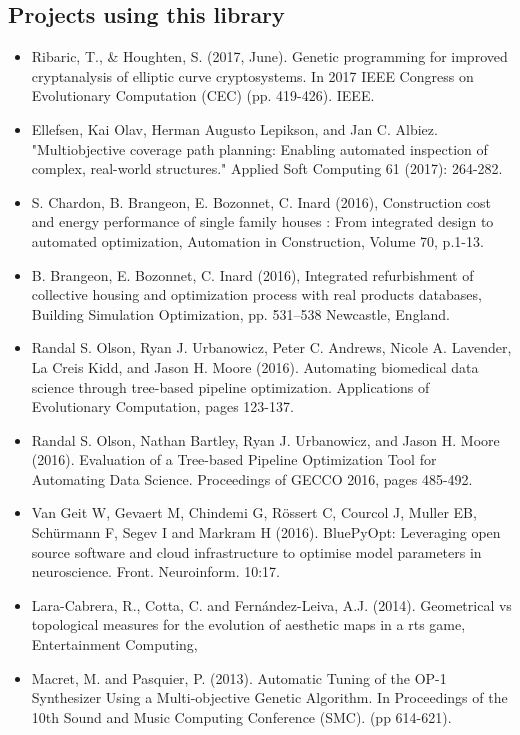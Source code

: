 \documentclass{article}
\begin{document}
	\subsection{Projects using this library}
	\begin{itemize}
		\item 
		Ribaric, T., & Houghten, S. (2017, June). Genetic programming for improved cryptanalysis of elliptic curve cryptosystems. In 2017 IEEE Congress on Evolutionary Computation (CEC) (pp. 419-426). IEEE.
		\item Ellefsen, Kai Olav, Herman Augusto Lepikson, and Jan C. Albiez. "Multiobjective coverage path planning: Enabling automated inspection of complex, real-world structures." Applied Soft Computing 61 (2017): 264-282.
		\item S. Chardon, B. Brangeon, E. Bozonnet, C. Inard (2016), Construction cost and energy performance of single family houses : From integrated design to automated optimization, Automation in Construction, Volume 70, p.1-13.
		\item B. Brangeon, E. Bozonnet, C. Inard (2016), Integrated refurbishment of collective housing and optimization process with real products databases, Building Simulation Optimization, pp. 531–538 Newcastle, England.
		\item Randal S. Olson, Ryan J. Urbanowicz, Peter C. Andrews, Nicole A. Lavender, La Creis Kidd, and Jason H. Moore (2016). Automating biomedical data science through tree-based pipeline optimization. Applications of Evolutionary Computation, pages 123-137.
		\item Randal S. Olson, Nathan Bartley, Ryan J. Urbanowicz, and Jason H. Moore (2016). Evaluation of a Tree-based Pipeline Optimization Tool for Automating Data Science. Proceedings of GECCO 2016, pages 485-492.
		\item Van Geit W, Gevaert M, Chindemi G, Rössert C, Courcol J, Muller EB, Schürmann F, Segev I and Markram H (2016). BluePyOpt: Leveraging open source software and cloud infrastructure to optimise model parameters in neuroscience. Front. Neuroinform. 10:17. 
		\item  Lara-Cabrera, R., Cotta, C. and Fernández-Leiva, A.J. (2014). Geometrical vs topological measures for the evolution of aesthetic maps in a rts game, Entertainment Computing,
		\item Macret, M. and Pasquier, P. (2013). Automatic Tuning of the OP-1 Synthesizer Using a Multi-objective Genetic Algorithm. In Proceedings of the 10th Sound and Music Computing Conference (SMC). (pp 614-621).

\end{itemize}
\end{document}

